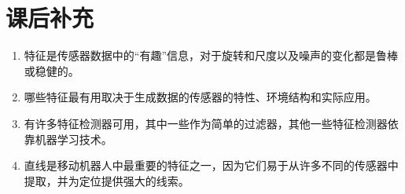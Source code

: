 \section*{课后补充}
\begin{enumerate}

\item 特征是传感器数据中的“有趣”信息，对于旋转和尺度以及噪声的变化都是鲁棒或稳健的。
\item 哪些特征最有用取决于生成数据的传感器的特性、环境结构和实际应用。
\item 有许多特征检测器可用，其中一些作为简单的过滤器，其他一些特征检测器依靠机器学习技术。
\item 直线是移动机器人中最重要的特征之一，因为它们易于从许多不同的传感器中提取，并为定位提供强大的线索。
\end{enumerate}

